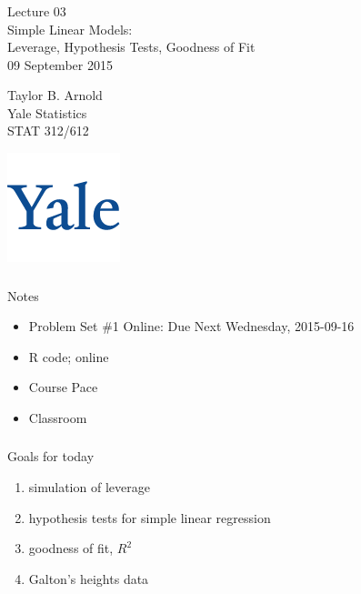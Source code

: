 



\begin{frame}[fragile] \frametitle{}

\vfill

{\fontsize{0.7cm}{0cm}\selectfont Lecture 03 \\\vspace{0.2cm} Simple Linear Models:\\
Leverage, Hypothesis Tests, Goodness of Fit}\\\vspace{0.5cm}
09 September 2015

\vspace{2cm}

\begin{minipage}{0.6\textwidth}
Taylor B. Arnold \\
Yale Statistics \\
STAT 312/612
\end{minipage}
\hfill
\begin{minipage}{0.3\textwidth}\raggedleft
\includegraphics[scale=0.3]{../yale-logo.png}
\end{minipage}%

\end{frame}


\begin{frame}[fragile] \frametitle{}

{\color{yaleblue}\fontsize{16pt}{20pt}\selectfont Notes}

\begin{itemize}
\item Problem Set \#1 Online: Due Next Wednesday, 2015-09-16
\item R code; online
\item Course Pace
\item Classroom
\end{itemize}

\end{frame}

\begin{frame}[fragile] \frametitle{}

{\color{yaleblue}\fontsize{16pt}{20pt}\selectfont Goals for today}

\begin{enumerate}
\item simulation of leverage
\item hypothesis tests for simple linear regression
\item goodness of fit, $R^2$
\item Galton's heights data
\end{enumerate}

\end{frame}

